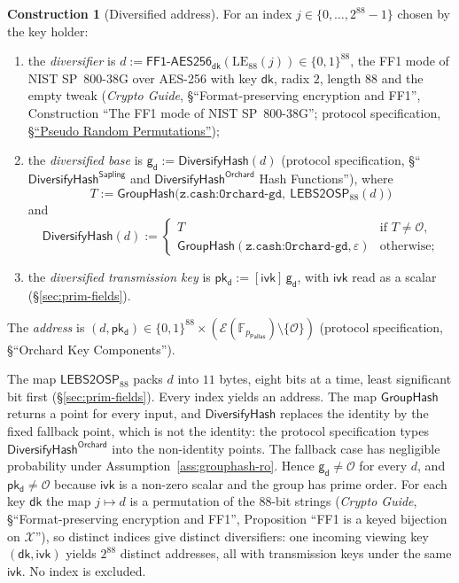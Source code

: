 \documentclass[11pt,a4paper]{article}
\theoremstyle{definition}
\newtheorem{construction}[theorem]{Construction}
\newcommand{\F}{\mathbb{F}}
\newcommand{\Pallas}{\ensuremath{\mathsf{Pallas}}}
\newcommand{\Ep}{\ensuremath{\mathcal{E}}}
\newcommand{\GroupHash}{\ensuremath{\mathsf{GroupHash}}}
\newcommand{\ivk}{\ensuremath{\mathsf{ivk}}}
\newcommand{\dk}{\ensuremath{\mathsf{dk}}}
\newcommand{\pkd}{\ensuremath{\mathsf{pk_d}}}
\newcommand{\gd}{\ensuremath{\mathsf{g_d}}}
\begin{document}
\begin{construction}[Diversified address]
For an index $j \in \{0, \dots, 2^{88} - 1\}$ chosen by the key holder:
\begin{enumerate}
\item the \emph{diversifier} is
  $d := \mathsf{FF1\text{-}AES256}_{\dk}(\mathrm{LE}_{88}(j)) \in
  \{0,1\}^{88}$, the FF1 mode of NIST SP~800-38G over AES-256 with key
  $\dk$, radix $2$, length $88$ and the empty tweak (\emph{Crypto Guide},
  \S``Format-preserving encryption and FF1'', Construction ``The FF1 mode
  of NIST SP~800-38G''; protocol specification,
  \href{https://zips.z.cash/protocol/protocol.pdf#concreteprps}%
  {\S``Pseudo Random Permutations''});
\item the \emph{diversified base} is $\gd := \mathsf{DiversifyHash}(d)$
  (protocol specification, \S``$\mathsf{DiversifyHash}^{\mathsf{Sapling}}$
  and $\mathsf{DiversifyHash}^{\mathsf{Orchard}}$ Hash Functions''), where
  \[
    T := \GroupHash\bigl(\texttt{z.cash:Orchard-gd},\
      \mathsf{LEBS2OSP}_{88}(d)\bigr)
  \]
  and
  \[
    \mathsf{DiversifyHash}(d) :=
    \begin{cases}
      T & \text{if } T \neq \mathcal{O}, \\
      \GroupHash(\texttt{z.cash:Orchard-gd}, \varepsilon)
        & \text{otherwise};
    \end{cases}
  \]
\item the \emph{diversified transmission key} is $\pkd := [\ivk]\,\gd$, with
  $\ivk$ read as a scalar (\S\ref{sec:prim-fields}).
\end{enumerate}
The \emph{address} is $(d, \pkd) \in \{0,1\}^{88} \times
(\Ep(\F_{p_{\Pallas}}) \setminus \{\mathcal{O}\})$ (protocol specification,
\S``Orchard Key Components'').
\end{construction}

The map $\mathsf{LEBS2OSP}_{88}$ packs $d$ into $11$ bytes, eight bits at a
time, least significant bit first (\S\ref{sec:prim-fields}). Every index
yields an address. The map $\GroupHash$ returns a point for every input, and
$\mathsf{DiversifyHash}$ replaces the identity by the fixed fallback point,
which is not the identity: the protocol specification types
$\mathsf{DiversifyHash}^{\mathsf{Orchard}}$ into the non-identity points.
The fallback case has negligible probability under
Assumption~\ref{ass:grouphash-ro}. Hence $\gd \neq \mathcal{O}$ for every
$d$, and $\pkd \neq \mathcal{O}$ because $\ivk$ is a non-zero scalar and the
group has prime order. For each key $\dk$ the map $j \mapsto d$ is a
permutation of the $88$-bit strings (\emph{Crypto Guide},
\S``Format-preserving encryption and FF1'', Proposition ``FF1 is a keyed
bijection on $\mathcal{X}$''), so distinct indices give distinct
diversifiers: one incoming viewing key $(\dk, \ivk)$ yields $2^{88}$
distinct addresses, all with transmission keys under the same $\ivk$. No
index is excluded.
\end{document}
